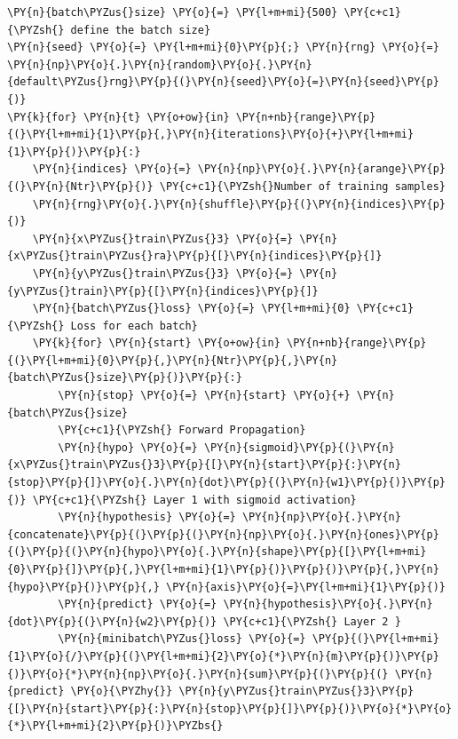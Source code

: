 \documentclass[a4paper,11pt]{article}%
\begin{document}
    \begin{tcolorbox}[breakable, size=fbox, boxrule=1pt, pad at break*=1mm,colback=cellbackground, colframe=cellborder]
\begin{Verbatim}[commandchars=\\\{\}]
\PY{n}{batch\PYZus{}size} \PY{o}{=} \PY{l+m+mi}{500} \PY{c+c1}{\PYZsh{} define the batch size}
\PY{n}{seed} \PY{o}{=} \PY{l+m+mi}{0}\PY{p}{;} \PY{n}{rng} \PY{o}{=} \PY{n}{np}\PY{o}{.}\PY{n}{random}\PY{o}{.}\PY{n}{default\PYZus{}rng}\PY{p}{(}\PY{n}{seed}\PY{o}{=}\PY{n}{seed}\PY{p}{)}
\PY{k}{for} \PY{n}{t} \PY{o+ow}{in} \PY{n+nb}{range}\PY{p}{(}\PY{l+m+mi}{1}\PY{p}{,}\PY{n}{iterations}\PY{o}{+}\PY{l+m+mi}{1}\PY{p}{)}\PY{p}{:}
    \PY{n}{indices} \PY{o}{=} \PY{n}{np}\PY{o}{.}\PY{n}{arange}\PY{p}{(}\PY{n}{Ntr}\PY{p}{)} \PY{c+c1}{\PYZsh{}Number of training samples}
    \PY{n}{rng}\PY{o}{.}\PY{n}{shuffle}\PY{p}{(}\PY{n}{indices}\PY{p}{)}
    \PY{n}{x\PYZus{}train\PYZus{}3} \PY{o}{=} \PY{n}{x\PYZus{}train\PYZus{}ra}\PY{p}{[}\PY{n}{indices}\PY{p}{]}
    \PY{n}{y\PYZus{}train\PYZus{}3} \PY{o}{=} \PY{n}{y\PYZus{}train}\PY{p}{[}\PY{n}{indices}\PY{p}{]}
    \PY{n}{batch\PYZus{}loss} \PY{o}{=} \PY{l+m+mi}{0} \PY{c+c1}{\PYZsh{} Loss for each batch}
    \PY{k}{for} \PY{n}{start} \PY{o+ow}{in} \PY{n+nb}{range}\PY{p}{(}\PY{l+m+mi}{0}\PY{p}{,}\PY{n}{Ntr}\PY{p}{,}\PY{n}{batch\PYZus{}size}\PY{p}{)}\PY{p}{:}
        \PY{n}{stop} \PY{o}{=} \PY{n}{start} \PY{o}{+} \PY{n}{batch\PYZus{}size}
        \PY{c+c1}{\PYZsh{} Forward Propagation}
        \PY{n}{hypo} \PY{o}{=} \PY{n}{sigmoid}\PY{p}{(}\PY{n}{x\PYZus{}train\PYZus{}3}\PY{p}{[}\PY{n}{start}\PY{p}{:}\PY{n}{stop}\PY{p}{]}\PY{o}{.}\PY{n}{dot}\PY{p}{(}\PY{n}{w1}\PY{p}{)}\PY{p}{)} \PY{c+c1}{\PYZsh{} Layer 1 with sigmoid activation}
        \PY{n}{hypothesis} \PY{o}{=} \PY{n}{np}\PY{o}{.}\PY{n}{concatenate}\PY{p}{(}\PY{p}{(}\PY{n}{np}\PY{o}{.}\PY{n}{ones}\PY{p}{(}\PY{p}{(}\PY{n}{hypo}\PY{o}{.}\PY{n}{shape}\PY{p}{[}\PY{l+m+mi}{0}\PY{p}{]}\PY{p}{,}\PY{l+m+mi}{1}\PY{p}{)}\PY{p}{)}\PY{p}{,}\PY{n}{hypo}\PY{p}{)}\PY{p}{,} \PY{n}{axis}\PY{o}{=}\PY{l+m+mi}{1}\PY{p}{)}
        \PY{n}{predict} \PY{o}{=} \PY{n}{hypothesis}\PY{o}{.}\PY{n}{dot}\PY{p}{(}\PY{n}{w2}\PY{p}{)} \PY{c+c1}{\PYZsh{} Layer 2 }
        \PY{n}{minibatch\PYZus{}loss} \PY{o}{=} \PY{p}{(}\PY{l+m+mi}{1}\PY{o}{/}\PY{p}{(}\PY{l+m+mi}{2}\PY{o}{*}\PY{n}{m}\PY{p}{)}\PY{p}{)}\PY{o}{*}\PY{n}{np}\PY{o}{.}\PY{n}{sum}\PY{p}{(}\PY{p}{(} \PY{n}{predict} \PY{o}{\PYZhy{}} \PY{n}{y\PYZus{}train\PYZus{}3}\PY{p}{[}\PY{n}{start}\PY{p}{:}\PY{n}{stop}\PY{p}{]}\PY{p}{)}\PY{o}{*}\PY{o}{*}\PY{l+m+mi}{2}\PY{p}{)}\PYZbs{}

\end{Verbatim}
\end{tcolorbox}
\end{document}
